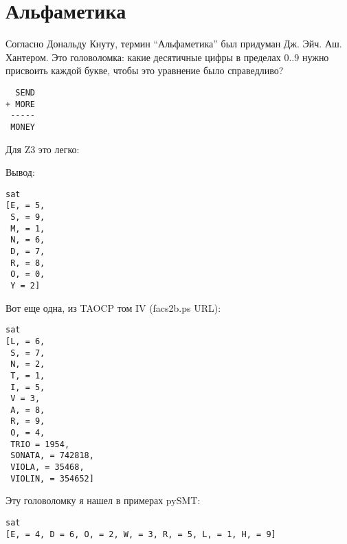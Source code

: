 \section{Альфаметика}

Согласно Дональду Кнуту, термин ``Альфаметика'' был придуман Дж. Эйч. Аш. Хантером.
Это головоломка: какие десятичные цифры в пределах 0..9 нужно присвоить каждой букве, чтобы это уравнение было справедливо?

\begin{lstlisting}
  SEND
+ MORE
 -----
 MONEY
\end{lstlisting}

Для Z3 это легко:



Вывод:

\begin{lstlisting}
sat
[E, = 5,
 S, = 9,
 M, = 1,
 N, = 6,
 D, = 7,
 R, = 8,
 O, = 0,
 Y = 2]
\end{lstlisting}

Вот еще одна, из \ac{TAOCP} том IV (facs2b.ps URL):



\begin{lstlisting}
sat
[L, = 6,
 S, = 7,
 N, = 2,
 T, = 1,
 I, = 5,
 V = 3,
 A, = 8,
 R, = 9,
 O, = 4,
 TRIO = 1954,
 SONATA, = 742818,
 VIOLA, = 35468,
 VIOLIN, = 354652]
\end{lstlisting}

Эту головоломку я нашел в примерах pySMT:



\begin{lstlisting}
sat
[E, = 4, D = 6, O, = 2, W, = 3, R, = 5, L, = 1, H, = 9]
\end{lstlisting}

